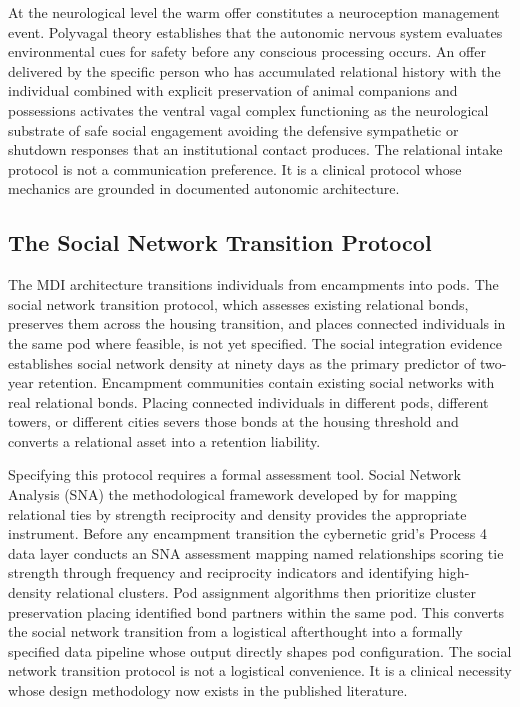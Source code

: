 \documentclass[12pt, letterpaper]{article}
\begin{document}
At the neurological level the warm offer constitutes a neuroception management event. Polyvagal theory \citep{porges_2011} establishes that the autonomic nervous system evaluates environmental cues for safety before any conscious processing occurs. An offer delivered by the specific person who has accumulated relational history with the individual combined with explicit preservation of animal companions and possessions activates the ventral vagal complex functioning as the neurological substrate of safe social engagement avoiding the defensive sympathetic or shutdown responses that an institutional contact produces. The relational intake protocol is not a communication preference. It is a clinical protocol whose mechanics are grounded in documented autonomic architecture.

\subsection{The Social Network Transition Protocol}

The MDI architecture transitions individuals from encampments into pods. The social network transition protocol, which assesses existing relational bonds, preserves them across the housing transition, and places connected individuals in the same pod where feasible, is not yet specified. The social integration evidence establishes social network density at ninety days as the primary predictor of two-year retention. Encampment communities contain existing social networks with real relational bonds. Placing connected individuals in different pods, different towers, or different cities severs those bonds at the housing threshold and converts a relational asset into a retention liability.

Specifying this protocol requires a formal assessment tool. Social Network Analysis (SNA) the methodological framework developed by \citet{wasserman_faust_1994} for mapping relational ties by strength reciprocity and density provides the appropriate instrument. Before any encampment transition the cybernetic grid's Process 4 data layer conducts an SNA assessment mapping named relationships scoring tie strength through frequency and reciprocity indicators and identifying high-density relational clusters. Pod assignment algorithms then prioritize cluster preservation placing identified bond partners within the same pod. This converts the social network transition from a logistical afterthought into a formally specified data pipeline whose output directly shapes pod configuration. The social network transition protocol is not a logistical convenience. It is a clinical necessity whose design methodology now exists in the published literature.
\end{document}

